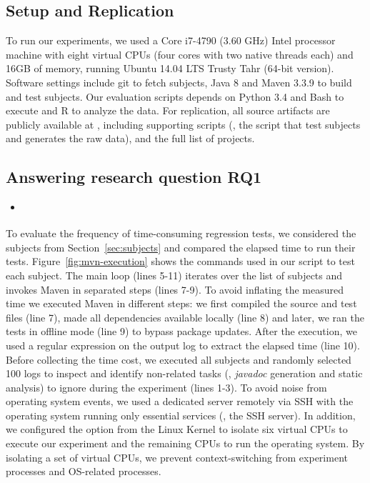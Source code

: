 \subsection{Setup and Replication}
\label{sec:setup}

To run our experiments, we used a Core i7-4790 (3.60 GHz) Intel
processor machine with eight virtual CPUs (four cores with two native
threads each) and 16GB of memory, running Ubuntu 14.04 LTS Trusty Tahr
(64-bit version). Software settings include git to fetch subjects,
Java 8 and Maven 3.3.9 to build and test subjects. Our evaluation
scripts depends on Python 3.4 and Bash to execute and R to analyze the
data. For replication, all source artifacts are publicly available at
, including supporting scripts (\eg, the script
that test subjects and generates the raw data), and the full list of
projects. 

\subsection{Answering research question RQ1}
\label{sec:rqA}

\begin{itemize}
    \item \emph{\RQA}
\end{itemize}

To evaluate the frequency of time-consuming regression tests, we
considered the \numSubjs{} subjects from Section~\ref{sec:subjects} and
compared the elapsed time to run their tests.
Figure~\ref{fig:mvn-execution} shows the commands used in our script
to test each subject. The main loop (lines 5-11) iterates over the
list of subjects and invokes Maven in separated steps (lines 7-9). To
avoid inflating the measured time we executed Maven in different
steps: we first compiled the source and test files (line 7), made all
dependencies available locally (line 8) and later, we ran the tests in
offline mode (line 9) to bypass package updates. After the execution,
we used a regular expression on the output log to extract the elapsed
time (line 10). Before collecting the time cost, we executed all
subjects and randomly selected 100 logs to inspect and identify
non-related tasks (\eg, \emph{javadoc} generation and static analysis)
to ignore during the experiment (lines 1-3).  To avoid noise from
operating system events, we used a dedicated server remotely via SSH
with the operating system running only essential services (\eg, the
SSH server). In addition, we configured the  option
from the Linux Kernel \cite{linux-kernel} to isolate six virtual CPUs
to execute our experiment and the remaining CPUs to run the operating
system. By isolating a set of virtual CPUs, we prevent
context-switching from experiment processes and OS-related processes.

